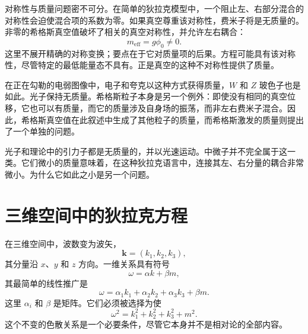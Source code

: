 \begin{classroomqa}
\end{classroomqa}

对称性与质量问题密不可分。在简单的狄拉克模型中，一个阻止左、右部分混合的对称性会迫使混合项的系数为零。如果真空尊重该对称性，费米子将是无质量的。非零的希格斯真空值破坏了相关的真空对称性，并允许左右耦合：
\begin{equation}
m_{\mathrm{eff}}=g\phi_0\neq0.
\end{equation}
这里不展开精确的对称变换；要点在于它对质量项的后果。方程可能具有该对称性，尽管特定的最低能量态不具有。正是真空的这种不对称性提供了质量。

在正在勾勒的电弱图像中，电子和夸克以这种方式获得质量，\(W\) 和 \(Z\) 玻色子也是如此。光子保持无质量。希格斯粒子本身是另一个例外：即使没有相同的真空位移，它也可以有质量，而它的质量涉及自身场的振荡，而非左右费米子混合。因此，希格斯真空值在此叙述中生成了其他粒子的质量，而希格斯激发的质量则提出了一个单独的问题。

\begin{classroomqa}
\end{classroomqa}

光子和理论中的引力子都是无质量的，并以光速运动。中微子并不完全属于这一类。它们微小的质量意味着，在这种狄拉克语言中，连接其左、右分量的耦合非常微小。为什么它如此之小是另一个问题。

\section{三维空间中的狄拉克方程}

在三维空间中，波数变为波矢，
\begin{equation}
\mathbf{k}=(k_1,k_2,k_3),
\end{equation}
其分量沿 \(x\)、\(y\) 和 \(z\) 方向。一维关系具有符号
\begin{equation}
\omega=\alpha k+\beta m,
\end{equation}
其最简单的线性推广是
\begin{equation}
\omega
=
\alpha_1 k_1+\alpha_2 k_2+\alpha_3 k_3+\beta m.
\end{equation}
这里 \(\alpha_i\) 和 \(\beta\) 是矩阵。它们必须被选择为使
\begin{equation}
\omega^2=k_1^2+k_2^2+k_3^2+m^2.
\end{equation}
这个不变的色散关系是一个必要条件，尽管它本身并不是相对论的全部内容。

